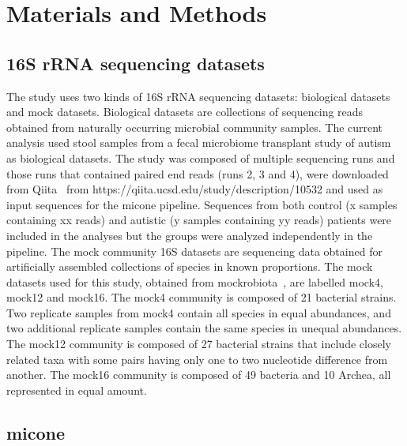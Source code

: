 
\section*{Materials and Methods}

  \subsection*{16S rRNA sequencing datasets}

  \vspace{-5mm}
    The study uses two kinds of 16S rRNA sequencing datasets: biological datasets and mock datasets.
    Biological datasets are collections of sequencing reads obtained from naturally occurring microbial community samples.
    The current analysis used stool samples from a fecal microbiome transplant study of autism~\cite{Kang2017} as biological datasets.
    The study was composed of multiple sequencing runs and those runs that contained paired end reads (runs 2, 3 and 4), were downloaded from Qiita~\cite{qiita} from https://qiita.ucsd.edu/study/description/10532 and used as input sequences for the \ac{micone} pipeline.
    Sequences from both control (x samples containing xx reads) and autistic (y samples containing yy reads) patients were included in the analyses but the groups were analyzed independently in the pipeline.
    The mock community 16S datasets are sequencing data obtained for artificially assembled collections of species in known proportions.
    The mock datasets used for this study, obtained from mockrobiota~\cite{Bokulich2016}, are labelled mock4, mock12 and mock16.
    The mock4 community is composed of 21 bacterial strains.
    Two replicate samples from mock4 contain all species in equal abundances, and two additional replicate samples contain the same species in unequal abundances.
    The mock12 community is composed of 27 bacterial strains that include closely related taxa with some pairs having only one to two nucleotide difference from another.
    The mock16 community is composed of 49 bacteria and 10 Archea, all represented in equal amount.

  \subsection*{\ac{micone}}

